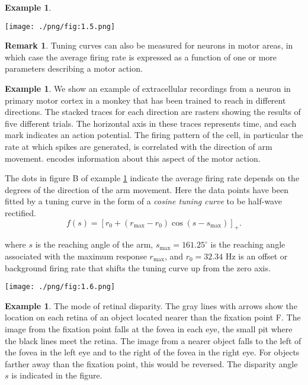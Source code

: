 \documentclass[letterpaper,oneside]{book}
\numberwithin{equation}{chapter}
\theoremstyle{definition}
\newtheorem{exm}[thm]{Example}
\newtheorem{rem}{Remark}[chapter]
\begin{document}
\begin{multicols}{2}
\begin{exm}
\begin{center}
  \texttt{[image: ./png/fig:1.5.png]}
\end{center}
\end{exm}

\begin{rem}
  Tuning curves can also be measured for neurons in motor areas, in which
case the average firing rate is expressed as a function of one or more parameters describing 
a motor action.
\end{rem}

\begin{exm}
  \label{fig:1.6}
  We show an example of extracellular recordings from a neuron in primary motor cortex 
  in a monkey
  that has been trained to reach in different directions. The stacked traces for
  each direction are rasters showing the results of five different trials. The
  horizontal axis in these traces represents time, and each mark indicates
  an action potential. The firing pattern of the cell, in particular the rate at
  which spikes are generated, is correlated with the direction of arm movement.%
  encodes information about this aspect of the motor action.

  The dots in figure B of example \ref{fig:1.6} indicate the average firing rate depends 
  on the degrees of the direction of the arm movement.
  Here the data points have
  been fitted by a tuning curve in the form of a \emph{cosine tuning curve} to be half-wave 
  rectified.
\begin{equation}
    \label{equ:1.16}
    f(s)=[r_0+\left(r_{\text{max}}-r_0\right)\cos\left(s-s_{\text{max}}\right)]_+.
  \end{equation}

  where $s$ is the reaching angle of the arm, $s_{\text{max}}=161.25^\circ$ is the reaching 
  angle associated with the maximum response $r_{\text{max}}$, and $r_0=32.34$ Hz is an 
  offset or background
  firing rate that shifts the tuning curve up from the zero axis. 
  \begin{center}
    \texttt{[image: ./png/fig:1.6.png]}
  \end{center}
\end{exm}

\begin{exm}
  \label{fig:1.7}
  The mode of retinal disparity. The gray lines with arrows show the
location on each retina of an object located nearer than the fixation point F. The
image from the fixation point falls at the fovea in each eye, the small pit where
the black lines meet the retina. The image from a nearer object falls to the left of
the fovea in the left eye and to the right of the fovea in the right eye. For objects
farther away than the fixation point, this would be reversed. The disparity angle $s$
is indicated in the figure.


\end{exm}
\end{multicols}
\end{document}
